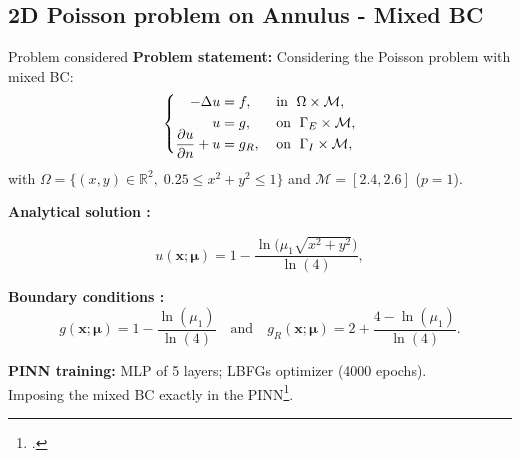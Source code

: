 \subsection{2D Poisson problem on Annulus - Mixed BC}

\begin{frame}{Problem considered} 
	\textbf{Problem statement:} Considering the Poisson problem with mixed BC:
	\vspace{-5pt}
	\begin{equation*}
		\left\{
		\begin{aligned}
			-\Delta u & = f, \; &  & \text{in } \; \Omega \times \mathcal{M}, \\
			u         & = g, \;  &  & \text{on } \; \Gamma_E \times \mathcal{M}, \\
			\smash{\frac{\partial u}{\partial n}}+u  & = g_R, \;  &  & \text{on } \; \Gamma_I \times \mathcal{M},
		\end{aligned}
		\right.
	\end{equation*}

	with $\Omega=\{(x,y)\in\mathbb{R}^2, \; 0.25\le x^2+y^2\le 1\}$ and $\mathcal{M}=[2.4,2.6]$ ($p=1$).
		
	\vspace{8pt}
	\textbf{Analytical solution :}

	\vspace{-12pt}
	\begin{equation*}
		u(\bm{x};\bm{\mu})= 1 - \frac{\ln\big(\mu_1\sqrt{x^2+y^2}\big)}{\ln(4)},
	\end{equation*}
	\vspace{-5pt}
	
	\textbf{Boundary conditions :}
	\begin{equation*}
		g(\bm{x};\bm{\mu})=1 - \frac{\ln(\mu_1)}{\ln(4)} \quad \text{and} \quad g_R(\bm{x};\bm{\mu})=2 + \frac{4-\ln(\mu_1)}{\ln(4)}.
	\end{equation*}

	\vspace{2pt}
	\textbf{PINN training:} MLP of 5 layers; LBFGs optimizer (4000 epochs). \\
	Imposing the mixed BC exactly in the PINN\footcite{Sukumar_2022}.

	\vspace{8pt}
\end{frame}

